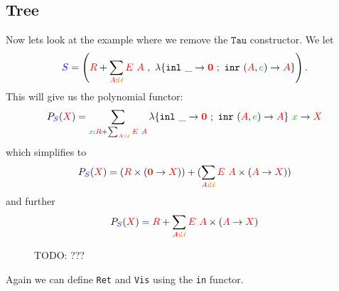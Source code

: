\documentclass[twoside,11pt,openright]{report}
\newcommand*{\term}[1]{\textcolor{green!70!black}{#1}}
\newcommand*{\type}[1]{\textcolor{red}{#1}}
\newcommand*{\container}[1]{\textcolor{blue}{#1}}
\newcommand*{\universe}[1]{\textcolor{orange}{#1}}
\newcommand*{\empt}{\type{\textbf{0}}}
\begin{document}
\subsection{Tree}
Now lets look at the example where we remove the \(\mathtt{Tau}\) constructor. We let
\begin{equation}
\container{S} = \left(\type{R} + \sum_{\type{A} : \universe{\mathcal{U}}} \type{E}~\type{A}~,~\lambda \{ \texttt{inl}~\_ \rightarrow \empt ~;~ \texttt{inr}~(\type{A},\term{e}) \rightarrow \type{A} \} \right).
\end{equation}
This will give us the polynomial functor:
\begin{equation}
  P_{\container{S}}(\type{X}) = \sum_{\term{x} : \type{R} + \sum_{\type{A} : \universe{\mathcal{U}}} \type{E}~\type{A}} \lambda \{ \texttt{inl}~\_ \rightarrow \empt ~;~ \texttt{inr}~(\type{A},\term{e}) \rightarrow \type{A} \}~\term{x} \rightarrow \type{X}
\end{equation}
which simplifies to
\begin{equation}
  P_{\container{S}}(\type{X}) = (\type{R} \times (\empt \rightarrow \type{X})) + (\sum_{\type{A} : \universe{\mathcal{U}}} \type{E}~\type{A} \times (\type{A} \rightarrow \type{X}))
\end{equation}
and further
\begin{equation}
  P_{\container{S}}(\type{X}) = \type{R} + \sum_{\type{A} : \universe{\mathcal{U}}} \type{E}~\type{A} \times (\type{A} \rightarrow \type{X})
\end{equation}

\begin{figure}[h]
  \centering
  \caption{TODO: ???}
\end{figure}
\noindent Again we can define \texttt{Ret} and \texttt{Vis} using the \texttt{in} functor.
\end{document}
